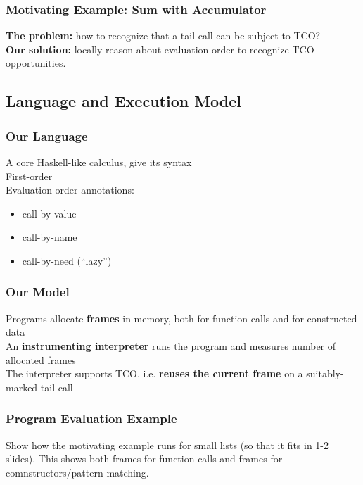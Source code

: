 \documentclass{beamer}
\begin{document}
\begin{frame}[fragile]
  \frametitle{Motivating Example: Sum with Accumulator}

  \textbf{The problem:} how to recognize that a tail call can be subject to TCO?\\[1em]

  \textbf{Our solution:} locally reason about evaluation order to recognize TCO opportunities.\\[1em]

\end{frame}

\subsection{Language and Execution Model}

\begin{frame}[fragile]
  \frametitle{Our Language}

  A core Haskell-like calculus, give its syntax\\[1em]

  First-order\\[1em]

  Evaluation order annotations:
  \begin{itemize}
  \item call-by-value
  \item call-by-name
  \item call-by-need (``lazy'')
  \end{itemize}
\end{frame}

\begin{frame}[fragile]
  \frametitle{Our Model}

Programs allocate \textbf{frames} in memory, both for function calls and for constructed data\\[1em]


An \textbf{instrumenting interpreter} runs the program and measures number of allocated frames\\[1em]

The interpreter supports TCO, i.e. \textbf{reuses the current frame} on a suitably-marked tail call\\[1em]

\end{frame}

\begin{frame}[fragile]
  \frametitle{Program Evaluation Example}

  Show how the motivating example runs for small lists (so that it
  fits in 1-2 slides). This shows both frames for function calls and
  frames for comnstructors/pattern matching.
\end{frame}
\end{document}
